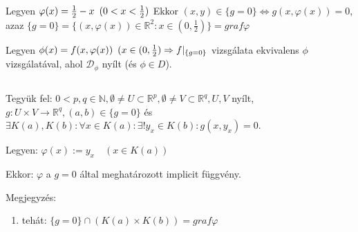 \documentclass[a4paper,11.5pt]{article}
\begin{document}
    Legyen $\varphi (x)=\frac{1}{2}-x\enskip (0<x<\frac{1}{2})$
    Ekkor $(x,y)\in\{g=0\}\Leftrightarrow g(x,\varphi (x))=0$, azaz $\{g=0\}=\{(x,\varphi (x))\in\mathbb{R}^{2}: x\in(0,\frac{1}{2})\}=graf\varphi$
    
    Legyen $\phi (x)=f(x,\varphi (x))\enskip (x\in (0,\frac{1}{2})\Rightarrow f|_{\{g=0\}}$ vizsgálata ekvivalens $\phi$ vizsgálatával, ahol $\mathcal{D}_{\phi}$ nyílt (és $\phi\in D$).
    
    \subsection{}
    Tegyük fel: $0<p,q\in\mathbb{N},\emptyset\neq U\subset\mathbb{R}^{p},\emptyset\neq V\subset\mathbb{R}^{q}, U, V$ nyílt, $g:U\times V\rightarrow\mathbb{R}^{q}, (a,b)\in\{g=0\}$ és $\exists K(a), K(b):\forall x\in K(a):\exists !y_x\in K(b):g(x,y_x )=0$.
    
    Legyen: $\varphi (x):=y_x\quad (x\in K(a))$
    
    Ekkor: $\varphi$ a $g=0$ által meghatározott implicit függvény.
    
    Megjegyzés:
    \begin{enumerate}
        \item tehát: $\{g=0\}\cap (K(a)\times K(b))=graf\varphi$
    \end{enumerate}
\end{document}
